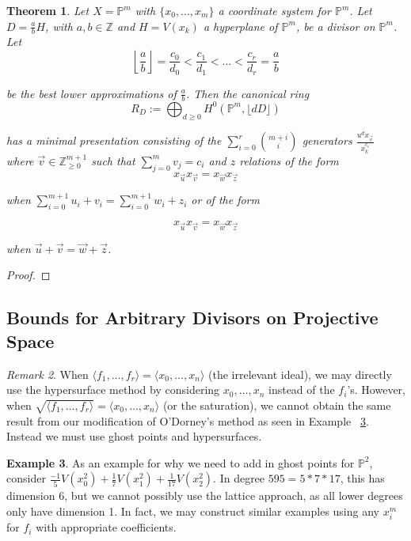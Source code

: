 \documentclass{amsart}
\theoremstyle{plain}
\newtheorem{thm}{Theorem}[section]
\theoremstyle{definition}
\newtheorem{example}[thm]{Example}
\theoremstyle{remark}
\newtheorem{rem}[thm]{Remark}
\numberwithin{equation}{section}
\newcommand\ssec{\subsection}
\newcommand\bp{{\mathbb P}}
\newcommand\bz{{\mathbb Z}}
\begin{document}
\begin{thm}
\label{thm:proj-one-point}
Let $X = \bp^m$ with $\{x_0, \ldots, x_m\}$ a coordinate system for
$\bp^m$. Let $D = \frac{a}{b} H$, with $a, b \in \bz$ and $H =
V(x_k)$ a hyperplane of $\bp^m$, be a divisor on $\bp^m$. Let
\[
	\left\lfloor \frac{a}{b} \right\rfloor = \frac{c_0}{d_0} < \frac{c_1}{d_1} <
	\ldots < \frac{c_r}{d_r} = \frac{a}{b}
\]

\noindent
be the best lower approximations of $\frac{a}{b}$. Then the
canonical ring
\[
	R_D := \bigoplus_{d \geq 0} H^0(\bp^m, \lfloor dD \rfloor)
\]

\noindent
has a minimal presentation consisting of the $\sum_{i = 0}^{r}
{{m + i} \choose {i}}$ generators $\frac{u^d x_{\vec{v}}}{x_k^{c_i}}$
where $\vec{v} \in \bz_{\geq 0}^{m + 1}$ such that $\sum_{j = 0}^{m}
v_j = c_i$ and $z$ relations of the form
\[
	x_{\vec{u}} x_{\vec{v}} = x_{\vec{w}} x_{\vec{z}}
\]

\noindent
when $\sum_{i = 0}^{m + 1} u_i + v_i = \sum_{i = 0}^{m + 1} w_i + z_i$
or of the form 

\[
	x_{\vec{u}} x_{\vec{v}} = x_{\vec{w}} x_{\vec{z}}
\]

\noindent
when $\vec{u} + \vec{v} = \vec{w} + \vec{z}$.
\end{thm}

\begin{proof}

\end{proof}

\ssec{Bounds for Arbitrary Divisors on Projective Space}



\begin{rem}
When $\langle f_1, \ldots, f_r \rangle = \langle x_0, \ldots, x_n \rangle$ (the irrelevant ideal), we may directly use the hypersurface method by considering $x_0, \ldots, x_n$ instead of the $f_i$'s. However, when $\sqrt{\langle f_1, \ldots, f_r \rangle} = \langle x_0, \ldots, x_n \rangle$ (or the saturation), we cannot obtain the same result from our modification of O'Dorney's method as seen in Example ~\ref{eg:radical}. Instead we must use ghost points and hypersurfaces.
\end{rem}

\begin{example}
\label{eg:radical}
As an example for why we need to add in ghost points for $\bp^2$, consider $\frac{-1}{5}V(x_0^2) + \frac{1}{7}V(x_1^2) + \frac{1}{17}V(x_2^2)$. In degree $595 = 5* 7 * 17$, this has dimension $6$, but we cannot possibly use the lattice approach, as all lower degrees only have dimension 1. In fact, we may construct similar examples using any $x_i^m$ for $f_i$ with appropriate coefficients.
\end{example}
\end{document}
